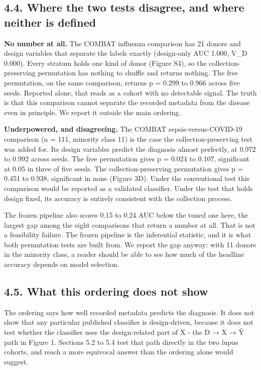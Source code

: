 \subsection{4.4. Where the two tests disagree, and where neither is defined}\label{where-the-two-tests-disagree-and-where-neither-is-defined}

\textbf{No number at all.} The COMBAT influenza comparison has 21 donors and design variables that separate the labels exactly (design-only AUC 1.000, V\_D 0.000). Every stratum holds one kind of donor (Figure S4), so the collection-preserving permutation has nothing to shuffle and returns nothing. The free permutation, on the same comparison, returns p = 0.299 to 0.966 across five seeds. Reported alone, that reads as a cohort with no detectable signal. The truth is that this comparison cannot separate the recorded metadata from the disease even in principle. We report it outside the main ordering.

\textbf{Underpowered, and disagreeing.} The COMBAT sepsis-versus-COVID-19 comparison (n = 111, minority class 11) is the case the collection-preserving test was added for. Its design variables predict the diagnosis almost perfectly, at 0.972 to 0.992 across seeds. The free permutation gives p = 0.024 to 0.107, significant at 0.05 in three of five seeds. The collection-preserving permutation gives p = 0.451 to 0.938, significant in none (Figure 3D). Under the conventional test this comparison would be reported as a validated classifier. Under the test that holds design fixed, its accuracy is entirely consistent with the collection process.

The frozen pipeline also scores 0.15 to 0.24 AUC below the tuned one here, the largest gap among the eight comparisons that return a number at all. That is not a feasibility failure. The frozen pipeline is the inferential statistic, and it is what both permutation tests are built from. We report the gap anyway: with 11 donors in the minority class, a reader should be able to see how much of the headline accuracy depends on model selection.

\subsection{4.5. What this ordering does not show}\label{what-this-ordering-does-not-show}

The ordering says how well recorded metadata predicts the diagnosis. It does not show that any particular published classifier is design-driven, because it does not test whether the classifier uses the design-related part of X - the D → X → Ŷ path in Figure 1. Sections 5.2 to 5.4 test that path directly in the two lupus cohorts, and reach a more equivocal answer than the ordering alone would suggest.

